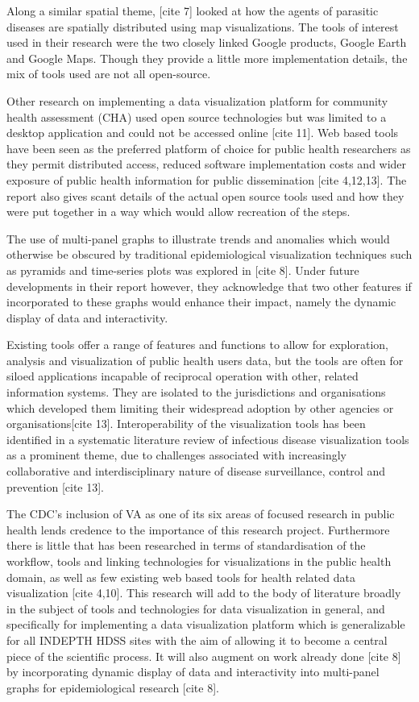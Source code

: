 Along a similar spatial theme, [cite 7] looked at how the agents of parasitic diseases are spatially distributed using map visualizations. The tools of interest used in their research were the two closely linked Google products, Google Earth and Google Maps. Though they provide a little more implementation details, the mix of tools used are not all open-source.

Other research on implementing a data visualization platform for community health assessment (CHA) used open source technologies but was limited to a desktop application and could not be accessed online [cite 11]. Web based tools have been seen as the preferred platform of choice for public health researchers as they permit distributed access, reduced software implementation costs and wider exposure of public health information for public dissemination [cite 4,12,13]. The report also gives scant details of the actual open source tools used and how they were put together in a way which would allow recreation of the steps. 

The use of multi-panel graphs to illustrate trends and anomalies which would otherwise be obscured by traditional epidemiological visualization techniques such as pyramids and time-series plots was explored in [cite 8]. Under future developments in their report however, they acknowledge that two other features if incorporated to these graphs would enhance their impact, namely the dynamic display of data and interactivity.

Existing tools offer a range of features and functions to allow for exploration, analysis and visualization of public health users data, but the tools are often for siloed applications incapable of reciprocal operation with other, related information systems. They are isolated to the jurisdictions and organisations which developed them limiting their widespread adoption by other agencies or organisations[cite 13]. Interoperability of the visualization tools has been identified in a systematic literature review of infectious disease visualization tools as a prominent theme, due to challenges associated with increasingly collaborative and interdisciplinary nature of disease surveillance, control and prevention [cite 13]. 

The CDC’s inclusion of VA as one of its six areas of focused research in public health lends credence to the importance of this research project. Furthermore there is little that has been researched in terms of standardisation of the workflow, tools and linking technologies for visualizations in the public health domain, as well as few existing web based tools for health related data visualization [cite 4,10].  This research will add to the body of literature broadly in the subject of tools and technologies for data visualization in general, and specifically for implementing a data visualization platform which is generalizable for all INDEPTH HDSS sites with the aim of allowing it to become a central piece of the scientific process. It will also augment on work already done [cite 8] by incorporating dynamic display of data and interactivity into multi-panel graphs for epidemiological research [cite 8].
